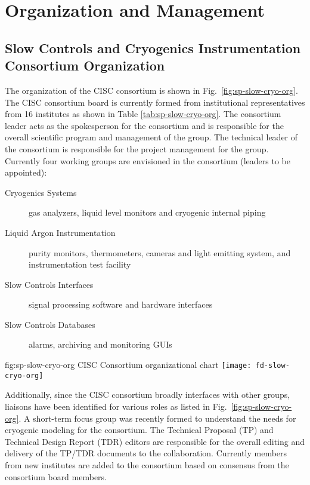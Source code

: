 \section{Organization and Management}
\label{sec:fdsp-slow-cryo-org}


\subsection{Slow Controls and Cryogenics Instrumentation Consortium Organization}
\label{sec:fdsp-slow-cryo-org-consortium}


The organization of the CISC consortium is shown in
Fig.\ \ref{fig:sp-slow-cryo-org}. The CISC consortium board is
currently formed from institutional representatives from 16 institutes
as shown in Table \ref{tab:sp-slow-cryo-org}. The consortium leader
acts as the spokesperson for the consortium and is responsible for the
overall scientific program and management of the group. The technical
leader of the consortium is responsible for the project management for
the group.  Currently four working groups are envisioned in the
consortium (leaders to be appointed):

\begin{description}
 \item[Cryogenics Systems] gas analyzers, liquid level
  monitors and cryogenic internal piping
 \item[Liquid Argon Instrumentation] purity monitors, thermometers,
  cameras and light emitting system, and instrumentation test facility
 \item[Slow Controls Interfaces] signal processing software and
  hardware interfaces
 \item[Slow Controls Databases] alarms, archiving and monitoring GUIs
\end{description}

\begin{dunefigure}{fig:sp-slow-cryo-org}
{CISC Consortium organizational chart}
\texttt{[image: fd-slow-cryo-org]}
\end{dunefigure}

Additionally, since the CISC consortium broadly interfaces with other
groups, liaisons have been identified for various roles as listed in
Fig.\ \ref{fig:sp-slow-cryo-org}. A short-term focus group was
recently formed to understand the needs for cryogenic modeling for the
consortium. The Technical Proposal (TP) and Technical Design Report
(TDR) editors are responsible for the overall editing and delivery of
the TP/TDR documents to the collaboration. Currently members from new
institutes are added to the consortium based on consensus from the
consortium board members.

